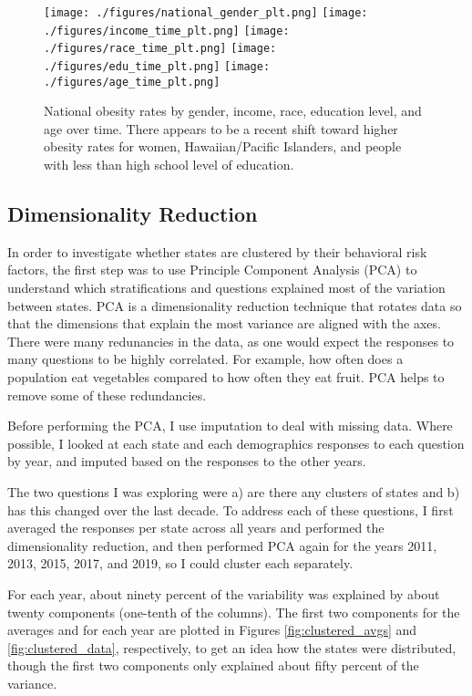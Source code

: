 \documentclass[11pt]{article}
\begin{document}
\begin{figure}[htbp]
\texttt{[image: ./figures/national\_gender\_plt.png]}
\texttt{[image: ./figures/income\_time\_plt.png]}
\texttt{[image: ./figures/race\_time\_plt.png]}
\texttt{[image: ./figures/edu\_time\_plt.png]}
\texttt{[image: ./figures/age\_time\_plt.png]}
\caption{
  National obesity rates by gender, income, race, education level, and age over time. There appears to be a recent shift toward higher obesity rates for women, Hawaiian/Pacific Islanders, and people with less than high school level of education. 
}
\label{fig:dems_by_time}
\end{figure}

\subsection{Dimensionality Reduction}
In order to investigate whether states are clustered by their behavioral risk factors, the first step was to use Principle Component Analysis (PCA) to understand which stratifications and questions explained most of the variation between states. PCA is a dimensionality reduction technique that rotates data so that the dimensions that explain the most variance are aligned with the axes. There were many redunancies in the data, as one would expect the responses to many questions to be highly correlated. For example, how often does a population eat vegetables compared to how often they eat fruit. PCA helps to remove some of these redundancies.

Before performing the PCA, I use imputation to deal with missing data. Where possible, I looked at each state and each demographics responses to each question by year, and imputed based on the responses to the other years.

The two questions I was exploring were a) are there any clusters of states and b) has this changed over the last decade. To address each of these questions, I first averaged the responses per state across all years and performed the dimensionality reduction, and then performed PCA again for the years 2011, 2013, 2015, 2017, and 2019, so I could cluster each separately. 

For each year, about ninety percent of the variability was explained by about twenty components (one-tenth of the columns). The first two components for the averages and for each year are plotted in Figures \ref{fig:clustered_avgs} and \ref{fig:clustered_data}, respectively, to get an idea how the states were distributed, though the first two components only explained about fifty percent of the variance.
\end{document}
